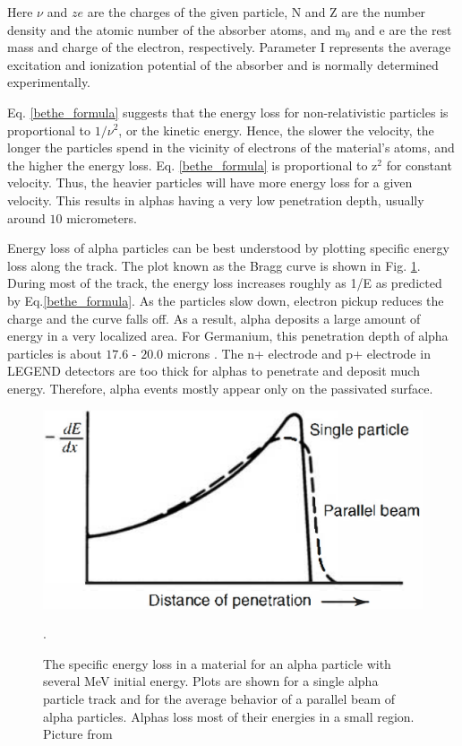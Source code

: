 Here $\nu$ and $ze$ are the charges of the given particle, N and Z are the number density and the atomic number of the absorber atoms, and  m$_0$ and e are the rest mass and charge of the electron, respectively. Parameter I represents the average excitation and ionization potential of the absorber and is normally determined experimentally. 

Eq. \ref{bethe_formula} suggests that the energy loss for non-relativistic particles is proportional to $1/\nu^2$, or the kinetic energy. Hence, the slower the velocity, the longer the particles spend in the vicinity of electrons of the material's atoms, and the higher the energy loss. Eq. \ref{bethe_formula} is proportional to z$^2$ for constant velocity. Thus, the heavier particles will have more energy loss for a given velocity. This results in alphas having a very low penetration depth, usually around $10$ micrometers.

Energy loss of alpha particles can be best understood by plotting specific energy loss along the track. The plot known as the Bragg curve is shown in Fig. \ref{bragg_curve_fig}. During most of the track, the energy loss increases roughly as 1/E as predicted by Eq.\ref{bethe_formula}. As the particles slow down, electron pickup reduces the charge and the curve falls off. As a result, alpha deposits a large amount of energy in a very localized area. For Germanium, this penetration depth of alpha particles is about $17.6$ - $20.0$ microns \cite{knoll_2010}. The n+ electrode and p+ electrode in LEGEND detectors are too thick for alphas to penetrate and deposit much energy. Therefore, alpha events mostly appear only on the passivated surface.

\begin{figure}
\centering
\includegraphics[width=0.5\linewidth]{ch3/figs/bragg_curve.png}
\caption{The specific energy loss in a material for an alpha particle with several MeV initial energy. Plots are shown for a single alpha particle track and for the average behavior of a parallel beam of alpha particles. Alphas loss most of their energies in a small region. Picture from \cite{knoll_2010}}. 
\label{bragg_curve_fig}
\end{figure}


